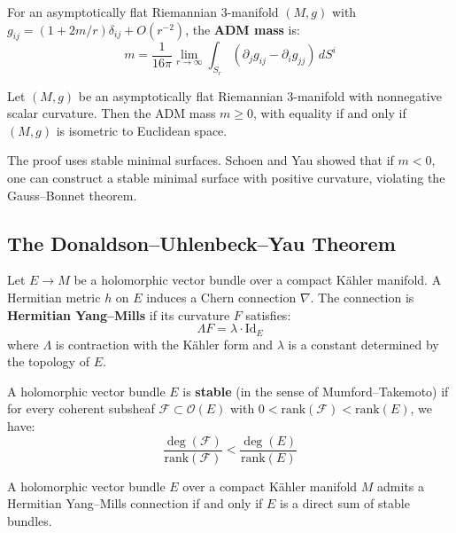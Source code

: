\begin{definition}
For an asymptotically flat Riemannian 3-manifold $(M, g)$ with $g_{ij} = (1 + 2m/r)\delta_{ij} + O(r^{-2})$, the \textbf{ADM mass} is:
\[
m = \frac{1}{16\pi} \lim_{r\to\infty} \int_{S_r} (\partial_j g_{ij} - \partial_i g_{jj}) \, dS^i
\]
\end{definition}

\begin{theorem}
Let $(M, g)$ be an asymptotically flat Riemannian 3-manifold with nonnegative scalar curvature. Then the ADM mass $m \geq 0$, with equality if and only if $(M, g)$ is isometric to Euclidean space.
\end{theorem}

The proof uses stable minimal surfaces. Schoen and Yau showed that if $m < 0$, one can construct a stable minimal surface with positive curvature, violating the Gauss--Bonnet theorem.

\subsection{The Donaldson--Uhlenbeck--Yau Theorem}

\begin{definition}
Let $E \to M$ be a holomorphic vector bundle over a compact K\"ahler manifold. A Hermitian metric $h$ on $E$ induces a Chern connection $\nabla$. The connection is \textbf{Hermitian Yang--Mills} if its curvature $F$ satisfies:
\[
\Lambda F = \lambda \cdot \mathrm{Id}_E
\]
where $\Lambda$ is contraction with the K\"ahler form and $\lambda$ is a constant determined by the topology of $E$.
\end{definition}

\begin{definition}[Stability]
A holomorphic vector bundle $E$ is \textbf{stable} (in the sense of Mumford--Takemoto) if for every coherent subsheaf $\mathcal{F} \subset \mathcal{O}(E)$ with $0 < \mathrm{rank}(\mathcal{F}) < \mathrm{rank}(E)$, we have:
\[
\frac{\deg(\mathcal{F})}{\mathrm{rank}(\mathcal{F})} < \frac{\deg(E)}{\mathrm{rank}(E)}
\]
\end{definition}

\begin{theorem}
A holomorphic vector bundle $E$ over a compact K\"ahler manifold $M$ admits a Hermitian Yang--Mills connection if and only if $E$ is a direct sum of stable bundles.
\end{theorem}

